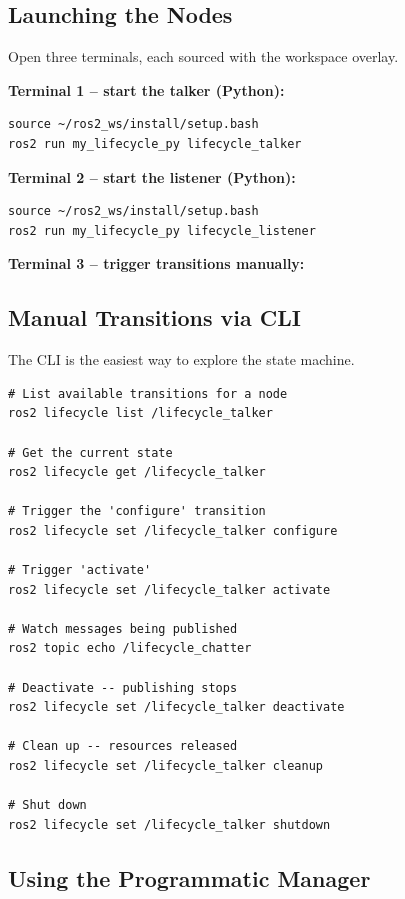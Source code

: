 \documentclass[11pt,a4paper]{csarticle}
\begin{document}
\subsection{Launching the Nodes}

Open three terminals, each sourced with the workspace overlay.

\textbf{Terminal 1 -- start the talker (Python):}
\begin{lstlisting}[style=bash]
source ~/ros2_ws/install/setup.bash
ros2 run my_lifecycle_py lifecycle_talker
\end{lstlisting}

\textbf{Terminal 2 -- start the listener (Python):}
\begin{lstlisting}[style=bash]
source ~/ros2_ws/install/setup.bash
ros2 run my_lifecycle_py lifecycle_listener
\end{lstlisting}

\textbf{Terminal 3 -- trigger transitions manually:}

\subsection{Manual Transitions via CLI}

The  CLI is the easiest way to explore the state machine.

\begin{lstlisting}[style=bash,caption={CLI transition commands}]
# List available transitions for a node
ros2 lifecycle list /lifecycle_talker

# Get the current state
ros2 lifecycle get /lifecycle_talker

# Trigger the 'configure' transition
ros2 lifecycle set /lifecycle_talker configure

# Trigger 'activate'
ros2 lifecycle set /lifecycle_talker activate

# Watch messages being published
ros2 topic echo /lifecycle_chatter

# Deactivate -- publishing stops
ros2 lifecycle set /lifecycle_talker deactivate

# Clean up -- resources released
ros2 lifecycle set /lifecycle_talker cleanup

# Shut down
ros2 lifecycle set /lifecycle_talker shutdown
\end{lstlisting}

\subsection{Using the Programmatic Manager}
\end{document}
